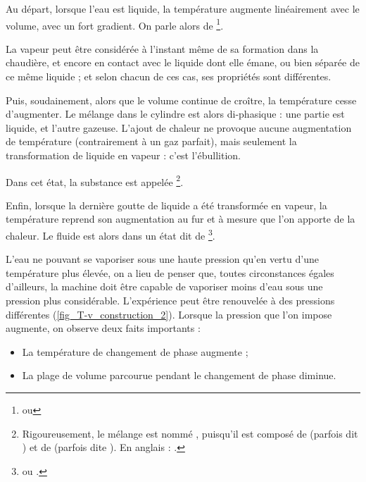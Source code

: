 		Au départ, lorsque l’eau est liquide, la température augmente linéairement avec le volume, avec un fort gradient. On parle alors de \footnote{ ou }. %

		La vapeur peut être considérée à l’instant même de sa formation dans la chaudière, et encore en contact avec le liquide dont elle émane, ou bien séparée de ce même liquide ; et selon chacun de ces cas, ses propriétés sont différentes.

		Puis, soudainement, alors que le volume continue de croître, la température cesse d’augmenter. Le mélange dans le cylindre est alors di-phasique : une partie est liquide, et l’autre gazeuse. L’ajout de chaleur ne provoque aucune augmentation de température (contrairement à un gaz parfait), mais seulement la transformation de liquide en vapeur : c’est l’ébullition.

		Dans cet état, la substance est appelée \footnote{Rigoureusement, le mélange est nommé , puisqu’il est composé de  (parfois dit ) et de  (parfois dite ). En anglais : .}\nolinebreak.

		Enfin, lorsque la dernière goutte de liquide a été transformée en vapeur, la température reprend son augmentation au fur et à mesure que l’on apporte de la chaleur. Le fluide est alors dans un état dit de \footnote{ ou .}\nolinebreak.%

		\clearfloats %
		L’eau ne pouvant se vaporiser sous une haute pression qu’en vertu d’une température plus élevée, on a lieu de penser que, toutes circonstances égales d’ailleurs, la machine doit être capable de vaporiser moins d’eau sous une pression plus considérable.
		L’expérience peut être renouvelée à des pressions différentes (\cref{fig_T-v_construction_2}). Lorsque la pression que l’on impose augmente, on observe deux faits importants :
		\begin{itemize}
			\item La température de changement de phase augmente ;
			\item La plage de volume parcourue pendant le changement de phase diminue.
		\end{itemize}

